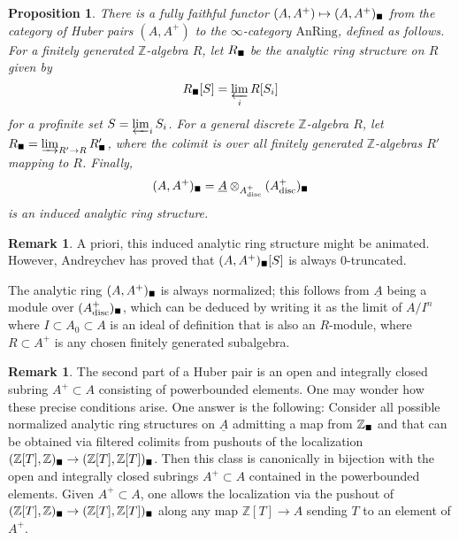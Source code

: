 \documentclass[11pt]{amsbook}
\newcommand{\AnRing}{{\mathrm{AnRing}}}
\newcommand{\solid}{{\mathsmaller{\blacksquare}}}
\numberwithin{equation}{section}
\numberwithin{theorem}{section}
\newtheorem{proposition}[theorem]{Proposition}
\theoremstyle{definition}
\newtheorem{remark}[theorem]{Remark}
\begin{document}
\begin{proposition} There is a fully faithful functor $(A,A^+)\mapsto (A,A^+)_\solid$ from the category of Huber pairs $(A,A^+)$ to the $\infty$-category $\AnRing$, defined as follows. For a finitely generated $\mathbb Z$-algebra $R$, let $R_\solid$ be the analytic ring structure on $R$ given by
\[
R_\solid[S] = \varprojlim_i R[S_i]
\]
for a profinite set $S=\varprojlim_i S_i$. For a general discrete $\mathbb Z$-algebra $R$, let $R_\solid = \varinjlim_{R'\to R} R'_\solid$, where the colimit is over all finitely generated $\mathbb Z$-algebras $R'$ mapping to $R$. Finally,
\[
(A,A^+)_\solid = \underline{A}\otimes_{A_{\mathrm{disc}}^+} (A^+_{\mathrm{disc}})_\solid
\]
is an induced analytic ring structure.
\end{proposition}

\begin{remark} A priori, this induced analytic ring structure might be animated. However, Andreychev has proved that $(A,A^+)_\solid[S]$ is always $0$-truncated.

The analytic ring $(A,A^+)_\solid$ is always normalized; this follows from $\underline{A}$ being a module over $(A^+_{\mathrm{disc}})_\solid$, which can be deduced by writing it as the limit of $A/I^n$ where $I\subset A_0\subset A$ is an ideal of definition that is also an $R$-module, where $R\subset A^+$ is any chosen finitely generated subalgebra.
\end{remark}

\begin{remark} The second part of a Huber pair is an open and integrally closed subring $A^+\subset A$ consisting of powerbounded elements. One may wonder how these precise conditions arise. One answer is the following: Consider all possible normalized analytic ring structures on $\underline{A}$ admitting a map from $\mathbb Z_\solid$ and that can be obtained via filtered colimits from pushouts of the localization $(\mathbb Z[T],\mathbb Z)_\solid\to (\mathbb Z[T],\mathbb Z[T])_\solid$. Then this class is canonically in bijection with the open and integrally closed subrings $A^+\subset A$ contained in the powerbounded elements. Given $A^+\subset A$, one allows the localization via the pushout of $(\mathbb Z[T],\mathbb Z)_\solid\to (\mathbb Z[T],\mathbb Z[T])_\solid$ along any map $\mathbb Z[T]\to A$ sending $T$ to an element of $A^+$.
\end{remark}
\end{document}
